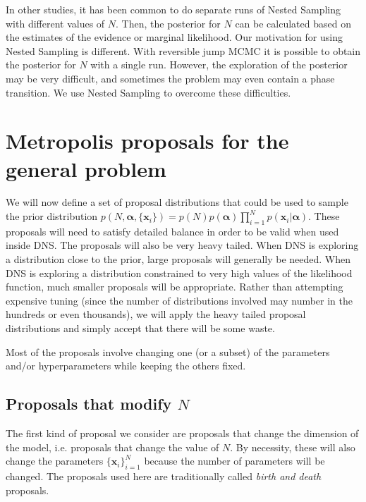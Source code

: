 \documentclass[letterpaper, 11pt]{article}
\newcommand{\hyperparams}{\boldsymbol{\alpha}}
\newcommand{\xx}{\mathbf{x}}
\begin{document}
In other studies, it has been common to do separate runs of Nested Sampling
with different values of $N$. Then, the posterior for $N$ can be calculated
based on the estimates of the evidence or marginal likelihood. Our motivation
for using Nested Sampling is different. With reversible jump MCMC it is possible
to obtain the posterior for $N$ with a single run. However, the exploration
of the posterior may be very difficult, and sometimes the problem may even
contain a phase transition. We use Nested Sampling to overcome these
difficulties.



\section{Metropolis proposals for the general problem}
We will now define a set of proposal distributions that could be used to
sample the prior distribution
$p(N, \hyperparams, \{\xx_i\}) = p(N) p(\hyperparams) \prod_{i=1}^N p(\xx_i | \hyperparams)$.
These proposals will need to satisfy detailed balance in order to be valid
when used inside DNS. The proposals will also be very heavy tailed. When
DNS is exploring a distribution close to the prior, large proposals will
generally be needed. When DNS is exploring a distribution constrained to
very high values of the likelihood function, much smaller proposals will be
appropriate. Rather than attempting expensive tuning (since the number of
distributions involved may number in the hundreds or even thousands), we will
apply the heavy tailed proposal distributions and simply accept that there will
be some waste.

Most of the proposals involve changing one (or a subset) of the parameters
and/or hyperparameters while keeping the others fixed.

\subsection{Proposals that modify $N$}\label{sec:proposal1}
The first kind of proposal we consider are proposals that change the
dimension of the model, i.e. proposals that change the value of $N$. By
necessity, these will also change the parameters $\{\xx_i\}_{i=1}^N$ because
the number of parameters will be changed. The proposals used here are
traditionally called {\it birth and death} proposals.
\end{document}
